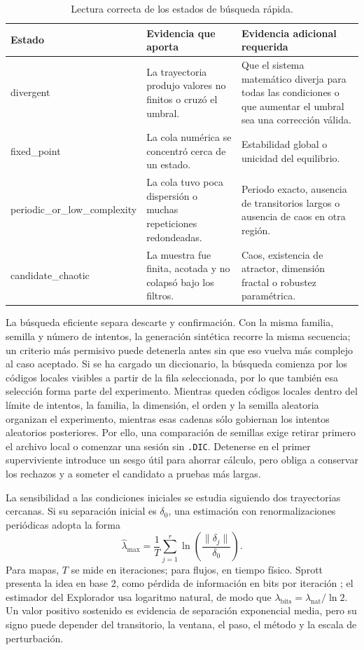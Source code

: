 \documentclass[11pt]{article}
\newcommand{\codigo}[1]{\texttt{#1}}
\begin{document}
\begin{table}[H]
\centering
\caption{Lectura correcta de los estados de búsqueda rápida.}
\small
\begin{tabularx}{\textwidth}{>{\ttfamily}p{}YY}
\toprule
{}
\color{white}\sffamily Estado & \color{white}\sffamily Evidencia que aporta &
\color{white}\sffamily Evidencia adicional requerida\\
\midrule
divergent & La trayectoria produjo valores no finitos o cruzó el umbral. & Que el
sistema matemático diverja para todas las condiciones o que aumentar el umbral sea una
corrección válida.\\
fixed\_point & La cola numérica se concentró cerca de un estado. & Estabilidad global o
unicidad del equilibrio.\\
periodic\_or\_low\_complexity & La cola tuvo poca dispersión o muchas repeticiones
redondeadas. & Periodo exacto, ausencia de transitorios largos o ausencia de caos en
otra región.\\
candidate\_chaotic & La muestra fue finita, acotada y no colapsó bajo los filtros. &
Caos, existencia de atractor, dimensión fractal o robustez paramétrica.\\
\bottomrule
\end{tabularx}
\end{table}

La búsqueda eficiente separa descarte y confirmación. Con la misma familia, semilla y
número de intentos, la generación sintética recorre la misma secuencia; un criterio más
permisivo puede detenerla antes sin que eso vuelva más complejo al caso aceptado. Si se
ha cargado un diccionario, la búsqueda comienza por los códigos locales visibles a
partir de la fila seleccionada, por lo que también esa selección forma parte del
experimento. Mientras queden códigos locales dentro del límite de intentos, la familia,
la dimensión, el orden y la semilla aleatoria organizan el experimento, mientras esas cadenas
sólo gobiernan los intentos aleatorios posteriores. Por ello, una comparación de
semillas exige retirar primero el archivo local o comenzar una sesión sin
\codigo{.DIC}. Detenerse en el primer superviviente introduce un sesgo útil para ahorrar
cálculo, pero obliga a conservar los rechazos y a someter el candidato a pruebas más
largas.

La sensibilidad a las condiciones iniciales se estudia siguiendo dos trayectorias
cercanas. Si su separación inicial es \(\delta_0\), una estimación con
renormalizaciones periódicas adopta la forma
\[
 \widehat{\lambda}_{\max}=
 \frac{1}{T}\sum_{j=1}^{r}
 \ln\!\left(\frac{\|\delta_j\|}{\delta_0}\right).
\]
Para mapas, \(T\) se mide en iteraciones; para flujos, en tiempo físico. Sprott presenta
la idea en base 2, como pérdida de información en bits por iteración
\cite{sprott1993}; el estimador del Explorador usa logaritmo natural, de modo que
\(\lambda_{\mathrm{bits}}=\lambda_{\mathrm{nat}}/\ln 2\). Un valor positivo sostenido
es evidencia de separación exponencial media, pero su signo puede depender del
transitorio, la ventana, el paso, el método y la escala de perturbación.
\end{document}
